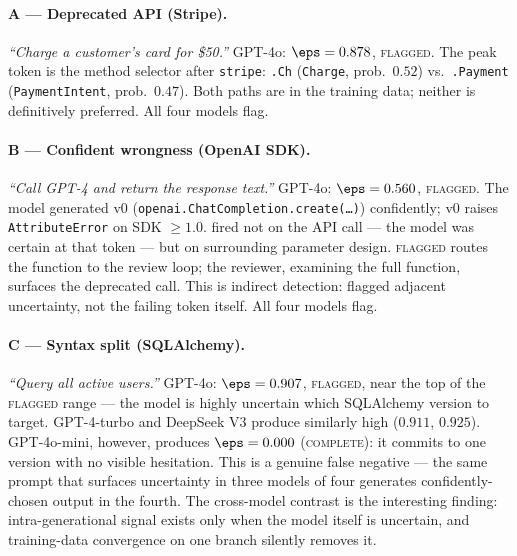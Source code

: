 \paragraph{A --- Deprecated API (Stripe).}
\textit{``Charge a customer's card for \$50.''} GPT-4o: $\eps =
0.878$, \textsc{flagged}. The peak token is the method selector
after \texttt{stripe}: \texttt{.Ch} (\texttt{Charge}, prob.\ $0.52$)
vs.\ \texttt{.Payment} (\texttt{PaymentIntent}, prob.\ $0.47$). Both
paths are in the training data; neither is definitively preferred.
All four models flag.

\paragraph{B --- Confident wrongness (OpenAI SDK).}
\textit{``Call GPT-4 and return the response text.''} GPT-4o: $\eps
= 0.560$, \textsc{flagged}. The model generated v0
(\texttt{openai.ChatCompletion.create(\ldots)}) confidently; v0
raises \texttt{AttributeError} on SDK $\ge 1.0$. \eps fired not on
the API call --- the model was certain at that token --- but on
surrounding parameter design. \textsc{flagged} routes the function
to the review loop; the reviewer, examining the full function,
surfaces the deprecated call. This is indirect detection: \eps
flagged adjacent uncertainty, not the failing token itself. All
four models flag.

\paragraph{C --- Syntax split (SQLAlchemy).}
\textit{``Query all active users.''} GPT-4o: $\eps = 0.907$,
\textsc{flagged}, near the top of the \textsc{flagged} range ---
the model is highly uncertain which SQLAlchemy version to target.
GPT-4-turbo and DeepSeek V3 produce similarly high \eps ($0.911$,
$0.925$). GPT-4o-mini, however, produces $\eps = 0.000$
(\textsc{complete}): it commits to one version with no visible
hesitation. This is a genuine false negative --- the same prompt
that surfaces uncertainty in three models of four generates
confidently-chosen output in the fourth. The cross-model contrast
is the interesting finding: intra-generational signal exists only
when the model itself is uncertain, and training-data convergence
on one branch silently removes it.

